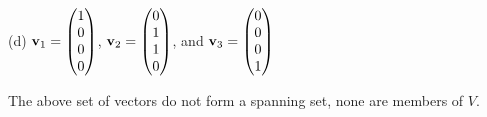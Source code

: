 \bigskip
\noindent
(d)
${\bf v}_1=\left(\begin{matrix}1\cr0\cr0\cr0\end{matrix}\right)$,
${\bf v}_2=\left(\begin{matrix}0\cr1\cr1\cr0\end{matrix}\right)$, and
${\bf v}_3=\left(\begin{matrix}0\cr0\cr0\cr1\end{matrix}\right)$

\bigskip
\noindent
The above set of vectors do not form a spanning set, none are members of $V$.



